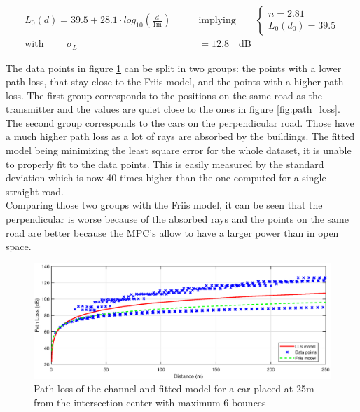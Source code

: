 \documentclass[10pt,a4paper]{ULBreport}
\begin{document}
\begin{align*}
    L_0(d) = 39.5 + 28.1 \cdot log_{10} \left(\frac{d}{1\text{m}}\right)\qquad
    &\text{implying} \qquad \left\{
    \begin{array}{l}
        n = 2.81 \\
        L_0(d_0) = 39.5
    \end{array}
    \right.\\
    \text{with } \qquad \sigma_L &= 12.8 \quad \text{dB}
\end{align*}

The data points in figure \ref{fig:path_loss_2} can be split in two groups: the points with a lower path loss, that stay close to the Friis model, and the points with a higher path loss. The first group corresponds to the positions on the same road as the transmitter and the values are quiet close to the ones in figure \ref{fig:path_loss}. \\
The second group corresponds to the cars on the perpendicular road. Those have a much higher path loss as a lot of rays are absorbed by the buildings. The fitted model being minimizing the least square error for the whole dataset, it is unable to properly fit to the data points. This is easily measured by the standard deviation which is now 40 times higher than the one computed for a single straight road. \\
Comparing those two groups with the Friis model, it can be seen that the perpendicular is worse because of the absorbed rays and the points on the same road are better because the MPC's allow to have a larger power than in open space. \\

\begin{figure}
    \centering
    \includegraphics[width=1\textwidth]{6_2.eps}
    \caption{Path loss of the channel and fitted model for a car placed at 25m from the intersection center with maximum 6 bounces}
    \label{fig:path_loss_2}
\end{figure}
\end{document}
